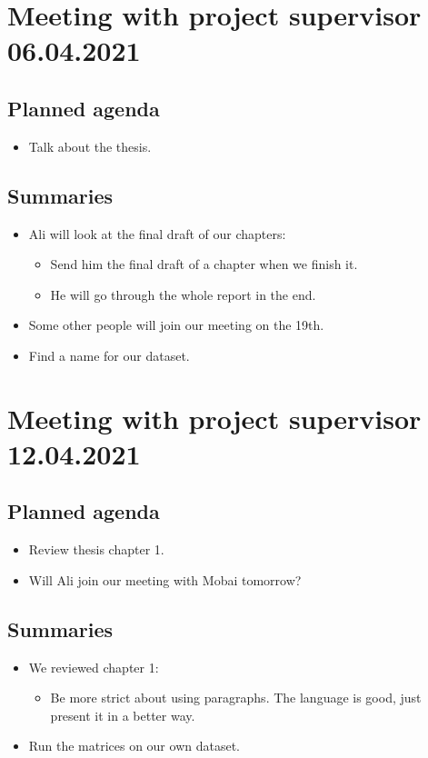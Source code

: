 \section*{Meeting with project supervisor 06.04.2021}
\subsection*{Planned agenda}
\begin{itemize}
    \item Talk about the thesis.
\end{itemize}

\subsection*{Summaries}
\begin{itemize}
    \item Ali will look at the final draft of our chapters: 
    \begin{itemize}
        \item Send him the final draft of a chapter when we finish it. 
        \item He will go through the whole report in the end.
    \end{itemize}
    \item Some other people will join our meeting on the 19th.
    \item Find a name for our dataset.
\end{itemize}



\section*{Meeting with project supervisor 12.04.2021}
\subsection*{Planned agenda}
\begin{itemize}
    \item Review thesis chapter 1.
    \item Will Ali join our meeting with Mobai tomorrow?
\end{itemize}

\subsection*{Summaries}
\begin{itemize}
    \item We reviewed chapter 1:
    \begin{itemize}
        \item Be more strict about using paragraphs. The language is good, just present it in a better way.
    \end{itemize}
    \item Run the matrices on our own dataset. 
\end{itemize}



